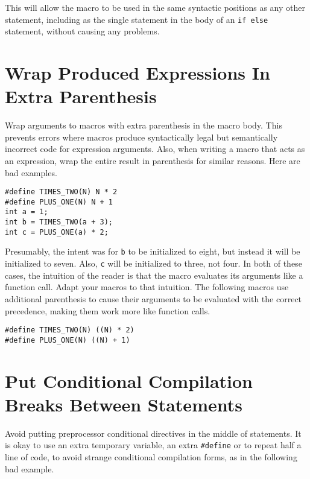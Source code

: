 \documentclass{lulu}
\newcommand{\code}[1]{\texttt{#1}\xspace}
\begin{document}
This will allow the macro to be used in the same syntactic positions
as any other statement, including as the single statement in the body
of an \code{if else} statement, without causing any problems.

\section{Wrap Produced Expressions In Extra Parenthesis}

Wrap arguments to macros with extra parenthesis in the macro body.
This prevents errors where macros produce syntactically legal but
semantically incorrect code for expression arguments.  Also, when
writing a macro that acts as an expression, wrap the entire result in
parenthesis for similar reasons.  Here are bad examples.

\begin{samepage}
\begin{verbatim}
#define TIMES_TWO(N) N * 2
#define PLUS_ONE(N) N + 1
int a = 1;
int b = TIMES_TWO(a + 3);
int c = PLUS_ONE(a) * 2;
\end{verbatim}
\end{samepage}

Presumably, the intent was for \code{b} to be initialized to eight,
but instead it will be initialized to seven.  Also, \code{c} will be
initialized to three, not four.  In both of these cases, the intuition
of the reader is that the macro evaluates its arguments like a
function call.  Adapt your macros to that intuition.  The following
macros use additional parenthesis to cause their arguments to be
evaluated with the correct precedence, making them work more like
function calls.

\begin{samepage}
\begin{verbatim}
#define TIMES_TWO(N) ((N) * 2)
#define PLUS_ONE(N) ((N) + 1)
\end{verbatim}
\end{samepage}

\section{Put Conditional Compilation Breaks Between Statements}

Avoid putting preprocessor conditional directives in the middle of
statements.  It is okay to use an extra temporary variable, an extra
\code{\#define} or to repeat half a line of code, to avoid strange
conditional compilation forms, as in the following bad example.
\end{document}

